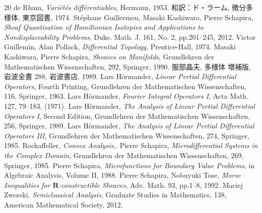 \documentclass[leqno, 10pt, a4paper, dvipdfmx]{jsarticle}
\theoremstyle{definition}
\newcommand{\rr}{\mathbf{R}}
\numberwithin{equation}{section}
\theoremstyle{mystyle}
\begin{document}
\begin{thebibliography}{20} 
  de Rham, \textit{Vari\'et\'es diff\'erentiables}, Hermann, 1953.
  和訳：ド・ラーム, 微分多様体, 東京図書, 1974.
   St\'ephane Guillermou, 
  Masaki Kashiwara, Pierre Schapira, 
  \textit{Sheaf Quantization of Hamiltonian Isotopies and Applications to Nondisplaceability Problems}, 
  Duke. Math. J. 161, No. 2, pp.201--245, 2012.  
   Victor Guillemin, Alan Pollack, 
    \textit{Differential Topology}, 
    Prentice-Hall, 1974.
   Masaki Kashiwara, Pierre Schapira, 
    \textit{Sheaves on Manifolds}, 
    Grundlehren der Mathematischen Wissenschaften, 292, Springer, 1990.
   服部晶夫, 多様体 増補版, 岩波全書 288, 岩波書店, 1989.
   Lars H\"ormander, 
  \textit{Linear Pertial Differential Operators}, Fourth Printing, 
  Grundlehren der Mathematischen Wissenschaften, 116, Springer, 1963.
   Lars H\"ormander, 
  \textit{Fourier Integral Operators I}, 
  Acta Math. 127, 79--183, (1971).
   Lars H\"ormander, 
  \textit{The Analysis of Linear Pertial Differential Operators I}, Second Edition,
  Grundlehren der Mathematischen Wissenschaften, 256, Springer, 1989.
   Lars H\"ormander, 
  \textit{The Analysis of Linear Pertial Differential Operators III}, 
  Grundlehren der Mathematischen Wissenschaften, 274, Springer, 1985.
   Rockaffeller, \textit{Convex Analysis},. 
   Pierre Schapira, 
  \textit{Microdifferential Systems in the Complex Domain}, 
  Grundlehren der Mathematischen Wissenschaften, 269, 
  Springer, 1985.
   Pierre Schapira, 
  \textit{Microfunctions for Boundary Value Problems}, 
  in Algebraic Analysis, Volume II, 1988.
   Pierre Schapira, Nobuyuki Tose, 
  \textit{Morse Inequalities for \(\rr\)-constructible Sheaves}, 
  Adv. Math. 93, pp.1--8, 1992. 
   Maciej Zworski,
  \textit{Semiclsaaical Analysis}, 
  Graduate Studies in Mathematics, 138, American Mathematical Society, 2012. 
\end{thebibliography}

\end{document}
